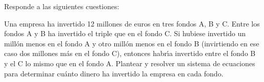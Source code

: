 \documentclass[addpoints,spanish, 12pt,a4paper]{exam}
\begin{document}
\begin{questions}
\begin{parts}
\end{parts}






\question[4] Responde a las siguientes cuestiones:


\question[4] Una empresa ha invertido 12 millones de euros en tres fondos
A, B y C. Entre los fondos A y B ha invertido el triple que en el fondo C. Si
hubiese invertido un millón menos en el fondo A y otro millón menos en el
fondo B (invirtiendo en ese caso dos millones más en el fondo C), entonces
habrı́a invertido entre el fondo B y el C lo mismo que en el fondo A. Plantear y
resolver un sistema de ecuaciones para determinar cuánto dinero ha invertido
la empresa en cada fondo.


\end{questions}
\end{document}
